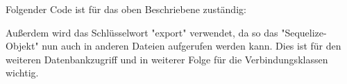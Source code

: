 Folgender Code ist für das oben Beschriebene zuständig:


Außerdem wird das Schlüsselwort "export" verwendet, da so das "Sequelize-Objekt" nun auch in anderen Dateien aufgerufen werden kann. Dies ist für den weiteren Datenbankzugriff und in weiterer Folge für die Verbindungsklassen wichtig.




